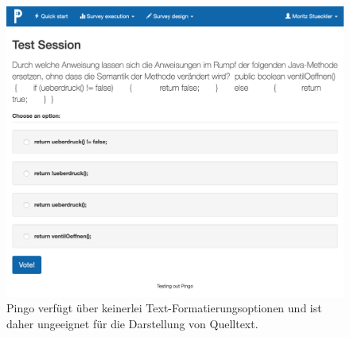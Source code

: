 \begin{figure}[H]
    \includegraphics[width=12cm]{chapter/bewertung/bilder/pingo_problem1.png}
    \centering
    \caption[Darstellung von Quelltexten in Pingo]{Pingo verfügt über keinerlei Text-Formatierungsoptionen und ist daher ungeeignet für die Darstellung von Quelltext.}
    \label{abb:pingo_frage}
\end{figure}